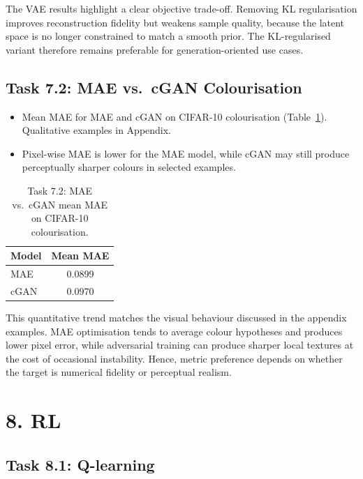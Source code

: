 The VAE results highlight a clear objective trade-off. Removing KL regularisation improves reconstruction fidelity but weakens sample quality, because the latent space is no longer constrained to match a smooth prior. The KL-regularised variant therefore remains preferable for generation-oriented use cases.

\subsection*{Task 7.2: MAE vs.\ cGAN Colourisation}
\begin{itemize}
  \item Mean MAE for MAE and cGAN on CIFAR-10 colourisation (Table~\ref{tab:mae_cgan}). Qualitative examples in Appendix.
\item Pixel-wise MAE is lower for the MAE model, while cGAN may still produce perceptually sharper colours in selected examples.
\end{itemize}

\begin{table}[!ht]
  \centering
  \small
  \setlength{\tabcolsep}{4pt}
  \caption{Task 7.2: MAE vs.\ cGAN mean MAE on CIFAR-10 colourisation.}
  \label{tab:mae_cgan}
  \begin{tabular}{lc}
    \toprule
    Model & Mean MAE \\
    \midrule
    MAE & 0.0899 \\
    cGAN & 0.0970 \\
    \bottomrule
  \end{tabular}
\end{table}

This quantitative trend matches the visual behaviour discussed in the appendix examples. MAE optimisation tends to average colour hypotheses and produces lower pixel error, while adversarial training can produce sharper local textures at the cost of occasional instability. Hence, metric preference depends on whether the target is numerical fidelity or perceptual realism.

\section*{8. RL}

\subsection*{Task 8.1: Q-learning}

